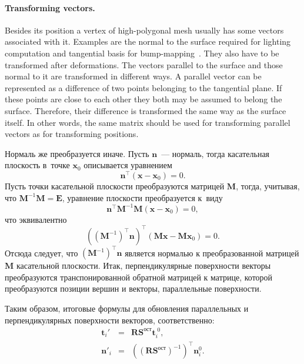 \documentclass[a4paper, 12pt, titlepage]{extarticle}
\newcommand{\vect}[1]{\mathbf{#1}} %
\newcommand{\matx}[1]{\mathbf{#1}} %
\newcommand{\transposed}{\top} %
\begin{document}
        \paragraph{Transforming vectors.}
        Besides its position a vertex of high-polygonal mesh usually has some vectors associated
        with it. Examples are the normal to the surface required for lighting computation and
        tangential basis for bump-mapping~\cite{blinn-bump}. They also have to be transformed after
        deformations. The vectors parallel to the surface and those normal to it are transformed in
        different ways. A parallel vector can be represented as a difference of two points belonging
        to the tangential plane. If these points are close to each other they both may be assumed to
        belong the surface. Therefore, their difference is transformed the same way as the surface
        itself. In other words, the same matrix should be used for transforming parallel vectors as
        for transforming positions.

\begin{original}
        Нормаль же преобразуется иначе. Пусть $\vect n$~---
        нормаль, тогда касательная плоскость в~точке $\vect{x}_0$ описывается уравнением
        \[
        \vect{n}^\transposed (\vect x - \vect{x}_0) = 0.
        \]
        Пусть точки касательной плоскости преобразуются матрицей $\matx M$, тогда, учитывая, что
        $\matx{M}^{-1} \matx{M} = \matx{E}$, уравнение плоскости преобразуется к~виду
        \[
          \vect{n}^\transposed \matx{M}^{-1} \matx{M} (\vect x - \vect{x}_0) = 0,
        \]
        что эквивалентно
        \[
           \left( (\matx{M}^{-1})^\transposed \vect{n} \right)^\transposed (\matx{M} \vect x - \matx{M} \vect{x}_0) = 0.
        \]
        Отсюда следует, что $(\matx{M}^{-1})^\transposed \vect{n}$ является нормалью к преобразованной
        матрицей $\matx M$ касательной плоскости. Итак, перпендикулярные поверхности векторы
        преобразуются транспонированной обратной матрицей к матрице, которой преобразуются позиции
        вершин и векторы, параллельные поверхности.

        Таким образом, итоговые формулы для обновления параллельных и перпендикулярных поверхности
        векторов, соответственно:
        \begin{eqnarray}
          \vect{t}_i\!' & = & \matx{R} \matx{S}^{ост} \vect{t}^{\;0}_i, \\
          \vect{n}'_i & = & \left(\left(\matx{R} \matx{S}^{ост}\right)^{-1}\right)^\transposed \vect{n}^0_i.
        \end{eqnarray}
\end{original}
\end{document}
